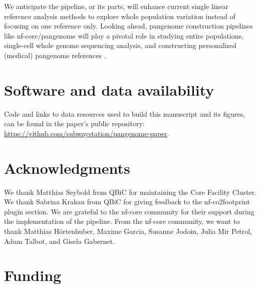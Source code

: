 \documentclass{bioinfo}
\theoremstyle{definition}
\begin{document}
	We anticipate the pipeline, or its parts, will enhance current single linear reference analysis methods to explore whole population variation instead of focusing on one reference only. Looking ahead, pangenome construction pipelines like nf-core/pangenome will play a pivotal role in studying entire populations, single-cell whole genome sequencing analysis, and constructing personalized (medical) pangenome references \citep{Sirn2023}.
	
	\vspace{-0.5cm}
	
	\section*{Software and data availability}
	
	Code and links to data resources used to build this manuscript and its figures, can be found in the paper’s public repository: \href{https://github.com/subwaystation/pangenome-paper}{https://github.com/subwaystation/pangenome-paper}.
	\vspace{-0.6cm}
	\section*{Acknowledgments}

	We thank Matthias Seybold from QBiC for maintaining the Core Facility Cluster. 
	We thank Sabrina Krakau from QBiC for giving feedback to the nf-co2footprint plugin section. 
	We are grateful to the nf-core community for their support during the implementation of the pipeline. 
	From the nf-core community, we want to thank Matthias Hörtenhuber, Maxime Garcia, Susanne Jodoin, Julia Mir Petrol, Adam Talbot, and Gisela Gabernet. 

	\vspace{-0.6cm}
	
	\section*{Funding}
	
\end{document}
